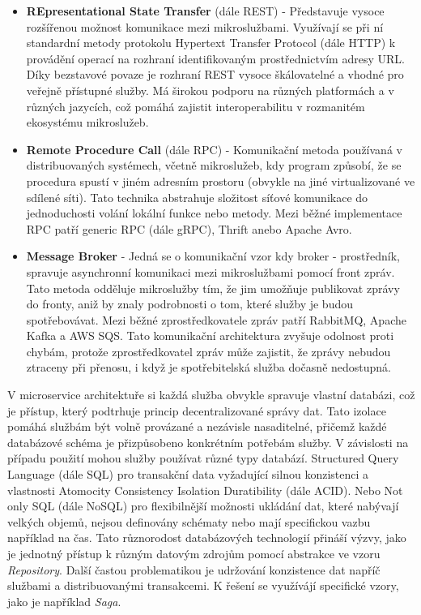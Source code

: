 \begin{itemize}
    \item \textbf{REpresentational State Transfer} (dále REST) - Představuje vysoce rozšířenou možnost komunikace mezi mikroslužbami. Využívají se při ní standardní metody protokolu Hypertext Transfer Protocol (dále HTTP) k provádění operací na rozhraní identifikovaným prostřednictvím adresy URL. Díky bezstavové povaze je rozhraní REST vysoce škálovatelné a vhodné pro veřejně přístupné služby. Má širokou podporu na různých platformách a v různých jazycích, což pomáhá zajistit interoperabilitu v rozmanitém ekosystému mikroslužeb.
    \item \textbf{Remote Procedure Call} (dále RPC) - Komunikační metoda používaná v distribuovaných systémech, včetně mikroslužeb, kdy program způsobí, že se procedura spustí v jiném adresním prostoru (obvykle na jiné virtualizované ve sdílené síti). Tato technika abstrahuje složitost síťové komunikace do jednoduchosti volání lokální funkce nebo metody. Mezi běžné implementace RPC patří generic RPC (dále gRPC), Thrift anebo Apache Avro. \cite{Sazanavets2022}
    \item \textbf{Message Broker} - Jedná se o komunikační vzor kdy broker - prostředník, spravuje asynchronní komunikaci mezi mikroslužbami pomocí front zpráv. Tato metoda odděluje mikroslužby tím, že jim umožňuje publikovat zprávy do fronty, aniž by znaly podrobnosti o tom, které služby je budou spotřebovávat. Mezi běžné zprostředkovatele zpráv patří RabbitMQ, Apache Kafka a AWS SQS. Tato komunikační architektura zvyšuje odolnost proti chybám, protože zprostředkovatel zpráv může zajistit, že zprávy nebudou ztraceny při přenosu, i když je spotřebitelská služba dočasně nedostupná. 
\end{itemize}


V microservice architektuře si každá služba obvykle spravuje vlastní databázi, což je přístup, který podtrhuje princip decentralizované správy dat. Tato izolace pomáhá službám být volně provázané a nezávisle nasaditelné, přičemž každé databázové schéma je přizpůsobeno konkrétním potřebám služby. V závislosti na případu použití mohou služby používat různé typy databází. Structured Query Language (dále SQL) pro transakční data vyžadující silnou konzistenci a vlastnosti Atomocity Consistency Isolation Duratibility (dále ACID). Nebo Not only SQL (dále NoSQL) pro flexibilnější možnosti ukládání dat, které nabývají velkých objemů, nejsou definovány schématy nebo mají specifickou vazbu například na čas. Tato různorodost databázových technologií přináší výzvy, jako je jednotný přístup k různým datovým zdrojům pomocí abstrakce ve vzoru \emph{Repository}. Další častou problematikou je udržování konzistence dat napříč službami a distribuovanými transakcemi. K řešení se využívájí specifické vzory, jako je například \emph{Saga}.

